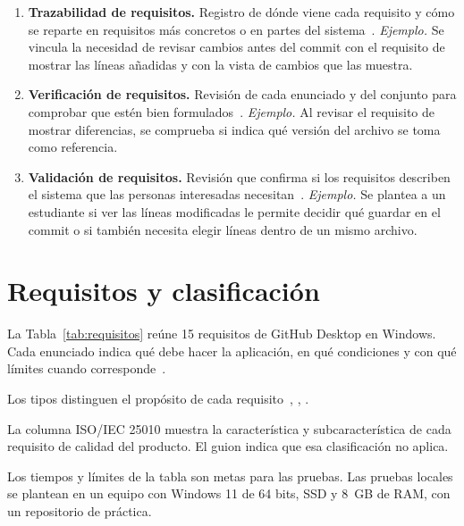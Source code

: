 \documentclass[11pt,a4paper]{article}
\begin{document}
\begin{enumerate}
  \item \textbf{Trazabilidad de requisitos.} Registro de dónde viene cada
  requisito y cómo se reparte en requisitos más concretos o en partes del
  sistema~\cite[Sec. 3.1.23]{iso29148}. \textit{Ejemplo.} Se vincula la
  necesidad de revisar cambios antes del commit con el requisito de mostrar
  las líneas añadidas y con la vista de cambios que las muestra.

  \item \textbf{Verificación de requisitos.} Revisión de cada enunciado y del
  conjunto para comprobar que estén bien formulados~\cite[Sec.
  3.1.26]{iso29148}. \textit{Ejemplo.} Al revisar el requisito de mostrar
  diferencias, se comprueba si indica qué versión del archivo se toma como
  referencia.

  \item \textbf{Validación de requisitos.} Revisión que confirma si los
  requisitos describen el sistema que las personas interesadas
  necesitan~\cite[Sec. 3.1.25]{iso29148}. \textit{Ejemplo.} Se plantea a un
  estudiante si ver las líneas modificadas le permite decidir qué guardar en
  el commit o si también necesita elegir líneas dentro de un mismo archivo.
\end{enumerate}

\section{Requisitos y clasificación}

La Tabla~\ref{tab:requisitos} reúne 15 requisitos de GitHub Desktop en
Windows. Cada enunciado indica qué debe hacer la aplicación, en qué
condiciones y con qué límites cuando corresponde~\cite[Sec. 5.2.4,
Fig. 1]{iso29148}.

Los tipos distinguen el propósito de cada requisito~\cite[Sec.
5.2.8.3]{iso29148}, \cite[Ch. 1, Sec. 1.4]{swebok},
\cite[Ch. 1, Sec. 1.7]{swebok}.

La columna ISO/IEC 25010 muestra la característica y subcaracterística
de cada requisito de calidad del producto. El guion indica que esa
clasificación no aplica.

Los tiempos y límites de la tabla son metas para las pruebas. Las pruebas
locales se plantean en un equipo con Windows 11 de 64 bits, SSD y 8~GB de
RAM, con un repositorio de práctica.
\end{document}
